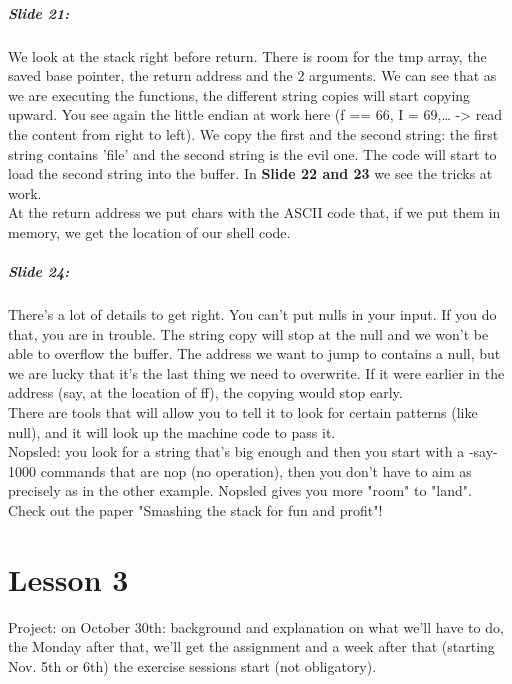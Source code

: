 \documentclass[10pt,a4paper]{report}
\begin{document}
\paragraph{Slide 21:} We look at the stack right before return. There is room for the tmp array, the saved base pointer, the return address and the 2 arguments. We can see that as we are executing the functions, the different string copies will start copying upward. You see again the little endian at work here (f == 66, I = 69,… -> read the content from right to left). 
We copy the first and the second string: the first string contains 'file' and the second string is the evil one. The code will start to load the second string into the buffer. In \textbf{Slide 22 and 23} we see the tricks at work. \\
At the return address we put chars with the ASCII code that, if we put them in memory, we get the location of our shell code. 

\paragraph{Slide 24:} There's a lot of details to get right. You can't put nulls in your input. If you do that, you are in trouble. The string copy will stop at the null and we won't be able to overflow the buffer. The address we want to jump to contains a null, but we are lucky that it's the last thing we need to overwrite. If it were earlier in the address (say, at the location of ff), the copying would stop early.\\
There are tools that will allow you to tell it to look for certain patterns (like null), and it will look up the machine code to pass it.\\
Nopsled: you look for a string that's big enough and then you start with a -say- 1000 commands that are nop (no operation), then you don't have to aim as precisely as in the other example. Nopsled gives you more "room" to "land". \\
Check out the paper "Smashing the stack for fun and profit"!

\chapter{Lesson 3}

Project: on October 30th: background and explanation on what we'll have to do, the Monday after that, we'll get the assignment and a week after that (starting Nov. 5th or 6th) the exercise sessions start (not obligatory).
\end{document}
